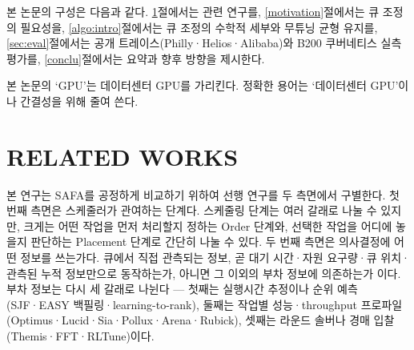 \documentclass{ieeetj}
\begin{document}
본 논문의 구성은 다음과 같다. \ref{Related}절에서는 관련 연구를, \ref{motivation}절에서는 큐 조정의 필요성을, \ref{algo:intro}절에서는 큐 조정의 수학적 세부와 무튜닝 균형 유지를, \ref{sec:eval}절에서는 공개 트레이스(Philly·Helios·Alibaba)와 B200 쿠버네티스 실측 평가를, \ref{conclu}절에서는 요약과 향후 방향을 제시한다.

본 논문의 `GPU'는 데이터센터 GPU를 가리킨다. 정확한 용어는 `데이터센터 GPU'이나 간결성을 위해 줄여 쓴다.

\section{RELATED WORKS}\label{Related}
본 연구는 SAFA를 공정하게 비교하기 위하여 선행 연구를 두 측면에서 구별한다. 첫 번째 측면은 스케줄러가 관여하는 단계다. 스케줄링 단계는 여러 갈래로 나눌 수 있지만, 크게는 어떤 작업을 먼저 처리할지 정하는 Order 단계와, 선택한 작업을 어디에 놓을지 판단하는 Placement 단계로 간단히 나눌 수 있다. 두 번째 측면은 의사결정에 어떤 정보를 쓰는가다. 큐에서 직접 관측되는 정보, 곧 대기 시간·자원 요구량·큐 위치·관측된 누적 정보만으로 동작하는가, 아니면 그 이외의 부차 정보에 의존하는가 이다. 부차 정보는 다시 세 갈래로 나뉜다 --- 첫째는 실행시간 추정이나 순위 예측(SJF·EASY 백필링·learning-to-rank), 둘째는 작업별 성능·throughput 프로파일(Optimus·Lucid·Sia·Pollux·Arena·Rubick), 셋째는 라운드 솔버나 경매 입찰(Themis·FFT·RLTune)이다.
\end{document}
